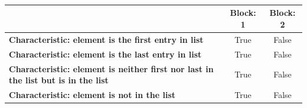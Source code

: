 \documentclass{article}
\begin{document}
\subsubsection{}
\begin{latin}
\begin{table}[H]
\begin{tabular}{|l|c|c|}
\hline
                                                                                          & \textbf{Block: 1} & \textbf{Block: 2} \\ \hline
\textbf{Characteristic: element is the first entry in list}                                 & True        & False       \\ \hline
\textbf{Characteristic: element is the last entry in list}                                  & True        & False       \\ \hline
\textbf{Characteristic: element is neither first nor last in the list but is in the list} & True        & False       \\ \hline
\textbf{Characteristic: element is not in the list}                                       & True        & False       \\ \hline
\end{tabular}
\end{table}
\end{latin}
\end{document}
